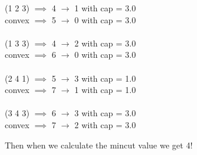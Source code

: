 \documentclass[12pt]{article}
\begin{document}
\begin{center}
(1 2 3) $\implies$ 4 $\rightarrow$ 1 with cap = 3.0 \\
convex $\implies$ 5 $\rightarrow$ 0 with cap = 3.0  \\ ~ \\
(1 3 3) $\implies$ 4 $\rightarrow$ 2 with cap = 3.0 \\
convex $\implies$ 6 $\rightarrow$ 0 with cap = 3.0  \\ ~ \\
(2 4 1) $\implies$ 5 $\rightarrow$ 3 with cap = 1.0 \\
convex $\implies$ 7 $\rightarrow$ 1 with cap = 1.0  \\ ~ \\
(3 4 3) $\implies$ 6 $\rightarrow$ 3 with cap = 3.0 \\
convex $\implies$ 7 $\rightarrow$ 2 with cap = 3.0
\end{center}

Then when we calculate the mincut value we get 4!






\end{document}
